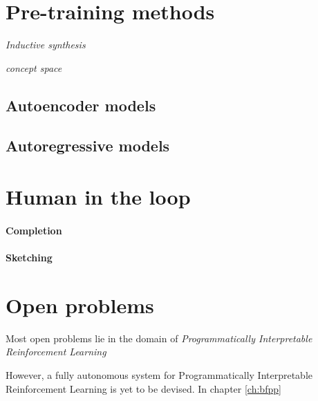 \section{Pre-training methods}

\emph{Inductive synthesis}

\emph{concept space}

\subsection{Autoencoder models}

\subsection{Autoregressive models}

\section{Human in the loop}

\paragraph{Completion}

\paragraph{Sketching}

\section{Open problems}

Most open problems lie in the domain of \emph{Programmatically Interpretable Reinforcement Learning}

However, a fully autonomous system for Programmatically Interpretable Reinforcement Learning is yet to be devised. In chapter \ref{ch:bfpp}
